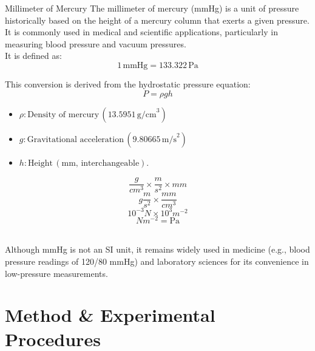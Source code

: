\documentclass{article}
\begin{document}
\begin{briefillus}{Millimeter of Mercury}{}
	The millimeter of mercury (mmHg) is a unit of pressure historically based on the height of a mercury column that exerts a given pressure. It is commonly used in medical and scientific applications, particularly in measuring blood pressure and vacuum pressures.\\[8pt]
	It is defined as:
	\[1\,\text{mmHg} = 133.322\,\text{Pa}\]
	\begin{minipage}{0.9\textwidth}		
		This conversion is derived from the hydrostatic pressure equation:\\
		\[P = \rho g h\]
		\begin{itemize}[itemsep=-1mm]
			\item \(\rho : \text{Density of mercury}\, (13.5951 \, \text{g/cm}^3)\)
			\item \(g : \text{Gravitational acceleration}\, (9.80665 \, \text{m/s}^2)\)
			\item \(h : \text{Height}\, (\text{mm},\, \text{interchangeable})\).	
		\end{itemize}
	\end{minipage}\hspace{-7em}
	\begin{minipage}{0.2\textwidth}\vspace{-2em}
		$$\frac{g}{cm^3} \times \frac{m}{s^2} \times mm$$
		$$g\frac{m}{s^2} \times\frac{mm}{cm^3}$$
		$$10^{-3}N \times10^{3}m^{-2}$$
		$$N m^{-2} = \text{Pa}$$
	\end{minipage}\\[8pt]
	Although mmHg is not an SI unit, it remains widely used in medicine (e.g., blood pressure readings of 120/80 mmHg) and laboratory sciences for its convenience in low-pressure measurements.
\end{briefillus}

\tikzexternalenable

	
	\newpage\vspace*{-20pt}
	\section{Method \& Experimental Procedures}\label{Method_Experimental_Procedures}
\end{document}
